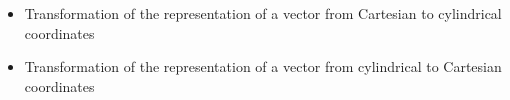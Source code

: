 \begin{ELunit}
\begin{itemize}
\tightlist
\item
  Transformation of the representation of a vector from Cartesian to cylindrical coordinates
\end{itemize}




\end{ELunit}

\begin{ELjoin}

\begin{itemize}
\tightlist
\item
  Transformation of the representation of a vector from cylindrical to Cartesian coordinates
\end{itemize}

\begin{ELimportant}{}


\end{ELimportant}

\end{ELjoin}

